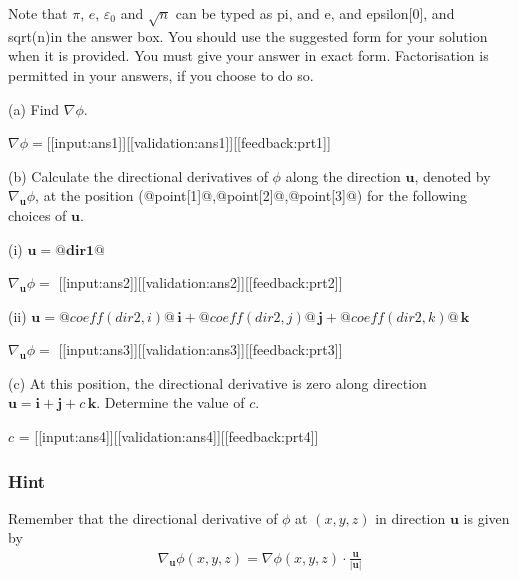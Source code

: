 \documentclass[a4paper,10pt]{article}
\begin{document}
Note that \(\pi\), $e$, $\varepsilon_{0}$ and $\sqrt{n}$ can be typed as pi, and e, and epsilon[0], and sqrt(n)in the answer box. You should use the suggested form for your solution when it is provided. You must give your answer in exact form. Factorisation is permitted in your answers, if you choose to do so.

(a) Find \(\nabla \phi\).

\(\nabla \phi = \)[[input:ans1]][[validation:ans1]][[feedback:prt1]]

(b) Calculate the directional derivatives of $\phi$ along the direction \(\mathbf u\), denoted by \(\nabla_{\textbf{u}} \phi\), at the position (@point[1]@,@point[2]@,@point[3]@) for the following choices of \(\mathbf u\).

(i) \(\mathbf{u} = \mathbf{@dir1@} \)

\(\nabla_{\textbf{u}} \phi =\) [[input:ans2]][[validation:ans2]][[feedback:prt2]]

(ii) \(\mathbf{u} = @coeff(dir2,i)@ \, \mathbf{i} + @coeff(dir2,j)@ \, \mathbf{j} +@coeff(dir2,k)@ \, \mathbf{k}\)

\(\nabla_{\textbf{u}} \phi =\) [[input:ans3]][[validation:ans3]][[feedback:prt3]]

(c) At this position, the directional derivative is zero along direction \(\mathbf{u} = \mathbf{i} + \mathbf{j} + c \, \mathbf{k}\). Determine the value of \(c\).

\(c\) = [[input:ans4]][[validation:ans4]][[feedback:prt4]]
\subsubsection{Hint}
Remember that the directional derivative of \(\phi\) at \((x,y,z)\) in direction \(\mathbf{u}\) is given by \begin{align*} \nabla_{\textbf{u}}\phi(x,y,z) = \nabla\phi(x,y,z) \cdot \frac{\textbf{u}}{|\textbf{u}|} \end{align*}
\end{document}
